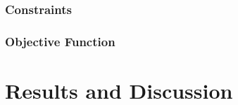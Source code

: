 \documentclass{article}
\begin{document}
\subsubsection{Constraints}
\subsubsection{Objective Function}

\section{Results and Discussion}

\begin{comment}
Create a short document (preferably in LaTeX) of about 3
pages containing:
* Problem description
* SCF, MCF, and MTZ formulations, and descriptions of used
variables and constraints
* Result table comparing all 3 formulations, including
objective function values, running times, numbers of branch-and-bound nodes
* Short interpretation of results

TODO: SCF, MCF formulations
TODO: Bench results, bench machine specs,
      benching method (repetitions, min of 5? 10?)
TODO: Discussion
\end{comment}
\end{document}
